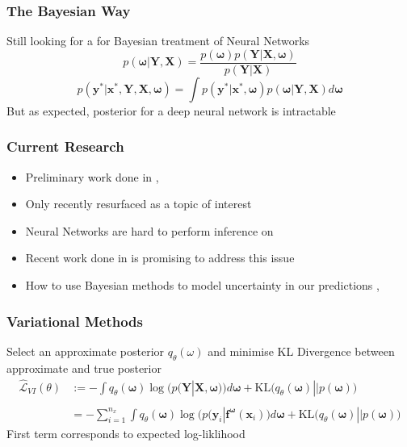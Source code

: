 \documentclass{beamer}
\newcommand{\mb}[1]{\mathbf{#1}}
\begin{document}
% 
% 
% 
% 
\begin{frame}
  \frametitle{The Bayesian Way}
  Still looking for a for Bayesian treatment of Neural Networks
  \begin{equation*}
    p(\mb{\omega}|\mb{Y}, \mb{X}) = \dfrac{p(\mb{\omega}) p(\mb{Y}|\mb{X}, \mb{\omega})}{p(\mb{Y}|\mb{X})}
  \end{equation*}
  \vspace*{0.5cm}
  \begin{equation*}
    p(\mb{y}^* |\mb{x}^*, \mb{Y}, \mb{X}, \mb{\omega}) = 
    \int p(\mb{y}^* |\mb{x}^*, \mb{\omega}) p(\mb{\omega}|\mb{Y}, \mb{X}) d\mb{\omega}
  \end{equation*}
  But as expected, posterior for a deep neural network is intractable
\end{frame}
% 
% 
% 
% 
% 
\begin{frame}
  \frametitle{Current Research}
  \begin{itemize}
  \item Preliminary work done in \cite{Neal1996}, \cite{mackay1992}
  \item Only recently resurfaced as a topic of interest
  \item Neural Networks are hard to perform inference on
  \item Recent work done in \cite{graves2011} is promising to address this issue
  \item How to use Bayesian methods to model uncertainty in our predictions \cite{kingma2015}, \cite{gal2016}
  \end{itemize}  
\end{frame}
% 
% 
% 
% 
\begin{frame}
  \frametitle{Variational Methods}
  Select an approximate posterior $q_\theta(\omega)$ and minimise KL Divergence between approximate and true posterior
  \begin{align*}
    \hat{\mathcal{L}}_{VI}(\theta) &:= - \int q_\theta (\mb{\omega})
    \log\Big( p(\mb{Y} | \mb{X}, \mb{\omega}) \Big) d\mb{\omega} +
    \text{KL}\Big( q_\theta (\mb{\omega}) || p (\mb{\omega}) \Big)
    \\
    \\
                                   &= - \sum_{i=1}^{n_x}\int q_\theta (\mb{\omega})
    \log\Big( p(\mb{y}_i | \mb{f}^{\mb{\omega}}(\mb{x}_i) \Big) d\mb{\omega} +
    \text{KL}\Big( q_\theta (\mb{\omega}) || p (\mb{\omega}) \Big)
  \end{align*}
  First term corresponds to expected log-liklihood
\end{frame}
\end{document}
